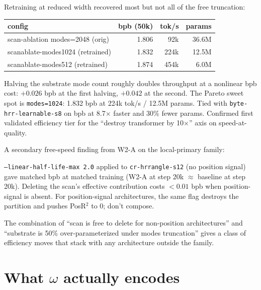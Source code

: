 Retraining at reduced width recovered most but not all of the free truncation:

\begin{center}
\begin{tabular}{lrrr}
\toprule
config & bpb (50k) & tok/s & params \\
\midrule
scan-ablation modes=2048 (orig)     & 1.806 & 92k   & 36.6M \\
scanablate-modes1024 (retrained)    & 1.832 & 224k  & 12.5M \\
scanablate-modes512  (retrained)    & 1.874 & 454k  &  6.0M \\
\bottomrule
\end{tabular}
\end{center}

\begin{result}
Halving the substrate mode count roughly doubles throughput at a nonlinear bpb cost: $+0.026$ bpb at the first halving, $+0.042$ at the second. The Pareto sweet spot is \texttt{modes=1024}: 1.832 bpb at 224k tok/s / 12.5M params. Tied with \texttt{byte-hrr-learnable-s8} on bpb at 8.7$\times$ faster and 30\% fewer params. Confirmed first validated efficiency tier for the ``destroy transformer by 10$\times$'' axis on speed-at-quality.
\end{result}

A secondary free-speed finding from W2-A on the local-primary family:

\begin{result}
\texttt{--linear-half-life-max 2.0} applied to \texttt{cr-hrrangle-s12} (no position signal) gave matched bpb at matched training (W2-A at step 20k $\approx$ baseline at step 20k). Deleting the scan's effective contribution costs $<0.01$ bpb when position-signal is absent. For position-signal architectures, the same flag destroys the partition and pushes PosR$^2$ to 0; don't compose.
\end{result}

The combination of ``scan is free to delete for non-position architectures'' and ``substrate is 50\% over-parameterized under modes truncation'' gives a class of efficiency moves that stack with any architecture outside the family.

\section{What $\omega$ actually encodes}

